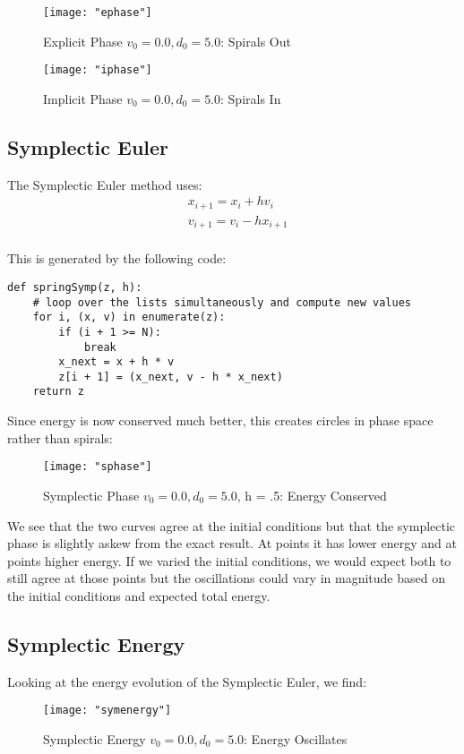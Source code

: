 \documentclass{article}
\begin{document}
\begin{figure}[h!]
	\centering
	\texttt{[image: "ephase"]}
	\caption{Explicit Phase $v_0 = 0.0, d_0 = 5.0$: Spirals Out}
\end{figure} 
\begin{figure}[h!]
	\centering
	\texttt{[image: "iphase"]}
	\caption{Implicit Phase $v_0 = 0.0, d_0 = 5.0$: Spirals In}
\end{figure} 
\FloatBarrier

\subsection{Symplectic Euler}

The Symplectic Euler method uses:
\begin{align*}
	&x_{i+1} = x_i + h v_i\\
	&v_{i+1} = v_i - h x_{i+1}\\
\end{align*}

This is generated by the following code:
\begin{verbatim}
def springSymp(z, h):
    # loop over the lists simultaneously and compute new values
    for i, (x, v) in enumerate(z):
        if (i + 1 >= N):
            break
        x_next = x + h * v
        z[i + 1] = (x_next, v - h * x_next)
    return z
\end{verbatim}

Since energy is now conserved much better, this creates circles in phase space rather than spirals:
\begin{figure}[h!]
	\centering
	\texttt{[image: "sphase"]}
	\caption{Symplectic Phase $v_0 = 0.0, d_0 = 5.0$, h = .5: Energy Conserved}
\end{figure} 
\FloatBarrier

We see that the two curves agree at the initial conditions but that the symplectic phase is slightly askew from the exact result. At points it
has lower energy and at points higher energy. If we varied the initial conditions, we would expect both to still agree at those points but the oscillations
could vary in magnitude based on the initial conditions and expected total energy.
 
\subsection{Symplectic Energy}
Looking at the energy evolution of the Symplectic Euler, we find: 
\begin{figure}[h!]
	\centering
	\texttt{[image: "symenergy"]}
	\caption{Symplectic Energy $v_0 = 0.0, d_0 = 5.0$: Energy Oscillates}
\end{figure} 
\FloatBarrier
\end{document}
